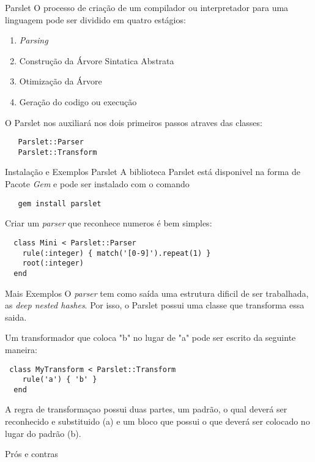 \documentclass{beamer}
\begin{document}
\begin{frame}[fragile]{Parslet}
O processo de criação de um compilador ou interpretador para uma linguagem pode ser dividido em quatro estágios:

\begin{enumerate}
\item \textit{Parsing}
\item Construção da Árvore Sintatica Abstrata
\item Otimização da Árvore
\item Geração do codigo ou execução
\end{enumerate}

O Parslet nos auxiliará nos dois primeiros passos atraves das classes: 
\begin{verbatim}
   Parslet::Parser
   Parslet::Transform
\end{verbatim}

\end{frame}

\begin{frame}[fragile]{Instalação e Exemplos Parslet}
A biblioteca Parslet está disponivel na forma de Pacote \textit{Gem} e pode ser instalado com o comando
\begin{verbatim}
   gem install parslet
\end{verbatim}
Criar um \textit{parser} que reconhece numeros é bem simples:
\begin{verbatim}
  class Mini < Parslet::Parser
    rule(:integer) { match('[0-9]').repeat(1) }
    root(:integer)
  end
\end{verbatim}
\end{frame}

\begin{frame}[fragile]{Mais Exemplos}
O \textit{parser} tem como saída uma estrutura dificil de ser trabalhada, as \textit{deep nested hashes}. Por isso, o Parslet possui uma classe que transforma essa saida. 

Um transformador que coloca "b" no lugar de "a" pode ser escrito da seguinte maneira:
\begin{verbatim}
 class MyTransform < Parslet::Transform
    rule('a') { 'b' }
  end
\end{verbatim}
A regra de transformaçao possui duas partes, um padrão, o qual deverá ser reconhecido e substituido (a) e um bloco que possui o que deverá ser colocado no lugar do padrão (b).
\end{frame}


\begin{frame}{Prós e contras}

\end{frame}
\end{document}
